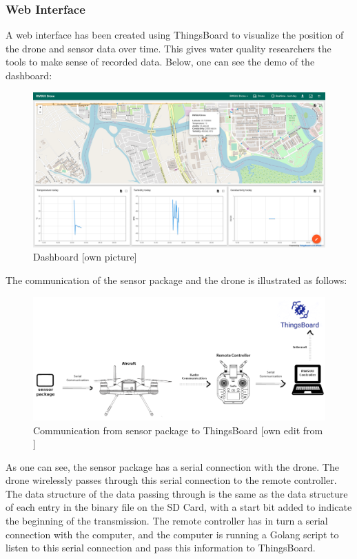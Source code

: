 \subsubsection{Web Interface}
A web interface has been created using ThingsBoard \cite{thingsboard} to visualize the position of the drone and sensor data over time. This gives water quality researchers the tools to make sense of recorded data. Below, one can see the demo of the dashboard:

\begin{figure}[h]
\centering
\includegraphics[scale=0.3]{070_design/software/63_dashboard.png}
\caption{Dashboard [own picture]}
\end{figure}

The communication of the sensor package and the drone is illustrated as follows:

\begin{figure}[h]
\centering
\includegraphics[scale=1]{070_design/software/62_comms.png}
\caption{Communication from sensor package to ThingsBoard [own edit from \cite{splashdronemanual}]}
\end{figure}

As one can see, the sensor package has a serial connection with the drone. The drone wirelessly passes through this serial connection to the remote controller. The data structure of the data passing through is the same as the data structure of each entry in the binary file on the SD Card, with a start bit added to indicate the beginning of the transmission. The remote controller has in turn a serial connection with the computer, and the computer is running a Golang script \cite{rwsuucontroller} to listen to this serial connection and pass this information to ThingsBoard.

